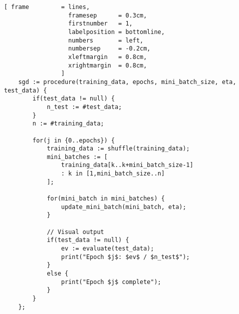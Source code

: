 \begin{Verbatim}[ frame         = lines, 
                  framesep      = 0.3cm, 
                  firstnumber   = 1,
                  labelposition = bottomline,
                  numbers       = left,
                  numbersep     = -0.2cm,
                  xleftmargin   = 0.8cm,
                  xrightmargin  = 0.8cm,
                ]
	sgd := procedure(training_data, epochs, mini_batch_size, eta, test_data) {
		if(test_data != null) {
			n_test := #test_data; 		
		}
		n := #training_data;
		
		for(j in {0..epochs}) {
			training_data := shuffle(training_data);
			mini_batches := [ 
				training_data[k..k+mini_batch_size-1] 
				: k in [1,mini_batch_size..n] 
			];
			
			for(mini_batch in mini_batches) {
				update_mini_batch(mini_batch, eta);
			} 
			
			// Visual output
			if(test_data != null) {
				ev := evaluate(test_data);
				print("Epoch $j$: $ev$ / $n_test$");
			}
			else {
				print("Epoch $j$ complete");
			}
		}
	};
\end{Verbatim}
